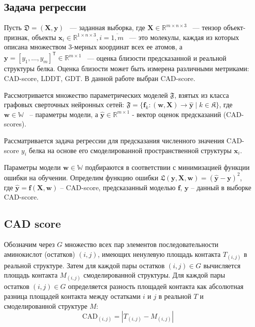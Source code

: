 \documentclass[12pt,twosides]{article}
\begin{document}
		\subsection{Задача регрессии}
		Пусть $\mathfrak{D} = (\mathbf{X}, \mathbf{y})$ ~--- заданная выборка, где $\mathbf{X}\in \mathbb{R}^{m\times n\times 3}$ ~--- тензор объект-признак, объекты $\mathbf{x}_i\in \mathbb{R}^{1\times n\times 3}, i=\overline{1,m}$ ~--- это молекулы, каждая из которых описана множеством 3-мерных координат всех ее атомов, а $\mathbf{y} = [y_1,\dots, y_m]^{\mathsf{T}}\in \mathbb{R}^{m\times 1}$ ~--- оценка близости предсказанной и реальной структуры белка. Оценка близости может быть измерена различными метриками: CAD-score\cite{Olechnovic2013CADscoreAN}, LDDT, GDT. В данной работе выбран CAD-score. 
		
		Рассмотривается множество параметрических моделей $\mathfrak{F}$, взятых из класса графовых сверточных нейронных сетей: $\mathfrak{F} = \{\mathbf{f}_k\colon(\mathbf{w}, \mathbf{X})\to  \mathbf{\hat{y}}\mid k \in \mathfrak{K}\}$, где $\mathbf{w} \in \mathbb{W}$ ~-- параметры модели, а $\hat{\mathbf{y}}\in \mathbb{R}^{m\times 1}$ - вектор оценок предсказаний (CAD-scores). 
		
		Рассматривается задача регрессии для предсказания численного значения CAD-score $y_i$ белка на основе его смоделированной пространственной структуры $\mathbf{x}_i$.
		
		Параметры модели $\mathbf{w}\in \mathbb{W}$ подбираются в соответствии с минимизацией функции ошибки на обучении. Определим функцию ошибки
		$\mathfrak{L}(\mathbf{y}, \mathbf{X}, \mathbf{w}) =\left( \mathbf{\hat{y}} - \mathbf{y} \right)^{2}$, где $\mathbf{\hat{y}} = \mathbf{f} (\mathbf{X},\mathbf{w})$ -- CAD-score, предсказанный моделью $\mathbf{f}$, $\mathbf{y}$ -- данный в выборке CAD-score.
		
		\subsection{CAD score}
		Обозначим через $G$ множество всех пар элементов последовательности аминокислот (остатков)  $(i, j)$, имеющих ненулевую площадь контакта $T_{(i, j)}$ в реальной структуре. Затем для каждой пары остатков $(i, j)\in G$ вычисляется площадь контакта $M_{(i, j)}$ смоделированной структуры. 
		Для каждой пары остатков $(i, j) \in G$ определяется разность площадей контакта как абсолютная разница площадей контакта между остатками $i$ и $j$ в реальной $T$ и смоделированной структуре $M$:
		$$\mathrm{CAD}_{(i, j)}=\left|T_{(i, j)}-M_{(i, j)}\right|$$
		
\end{document}
